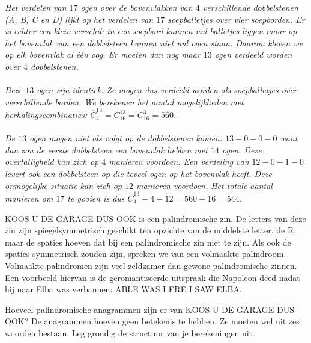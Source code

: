 \begin{werktekstoef}
\emph{Het verdelen van $17$ ogen over de bovenvlakken van $4$ verschillende  dobbelstenen (A, B, C en D) lijkt op het verdelen van $17$ soepballetjes over vier soepborden. Er is echter een klein verschil: in een soepbord kunnen nul balletjes liggen maar op het bovenvlak van een dobbelsteen kunnen niet nul ogen staan. Daarom kleven we op elk bovenvlak al één oog. Er moeten dan nog maar $13$ ogen verdeeld worden over $4$ dobbelstenen. \\ \\ Deze $13$ ogen zijn identiek. Ze mogen dus verdeeld worden als soepballetjes over verschillende borden. We berekenen het aantal mogelijkheden met herhalingscombinaties: $\overline{C}_4^{13}=C_{16}^{13}=C_{16}^3=560$. \\ \\ De $13$ ogen mogen niet als volgt op de dobbelstenen komen: $13-0-0-0$ want dan zou de eerste dobbelsteen een bovenvlak hebben met $14$ ogen. Deze overtalligheid kan zich op $4$ manieren voordoen. Een verdeling van $12-0-1-0$ levert ook een dobbelsteen op die teveel ogen op het bovenvlak heeft. Deze onmogelijke situatie kan zich op $12$ manieren voordoen. Het totale aantal manieren om $17$ te gooien is dus $\overline{C}_4^{13}-4-12=560-16=544$. }

\item{KOOS U DE GARAGE DUS OOK is een palindromische zin. De letters van deze zin zijn spiegelsymmetrisch geschikt ten opzichte van de middelste letter, de R, maar de spaties hoeven dat bij een palindromische zin niet te zijn. Als ook de spaties symmetrisch zouden zijn, spreken we van een volmaakte palindroom. Volmaakte palindromen zijn veel zeldzamer dan gewone palindromische zinnen. Een voorbeeld hiervan is de geromantiseerde uitspraak die  Napoleon deed nadat hij naar Elba was verbannen: ABLE WAS I ERE I SAW ELBA. 

Hoeveel palindromische anagrammen zijn er van KOOS U DE GARAGE DUS OOK? De anagrammen hoeven geen betekenis te hebben. Ze moeten wel uit zes woorden bestaan. Leg grondig de structuur van je berekeningen uit.}


\end{werktekstoef}
